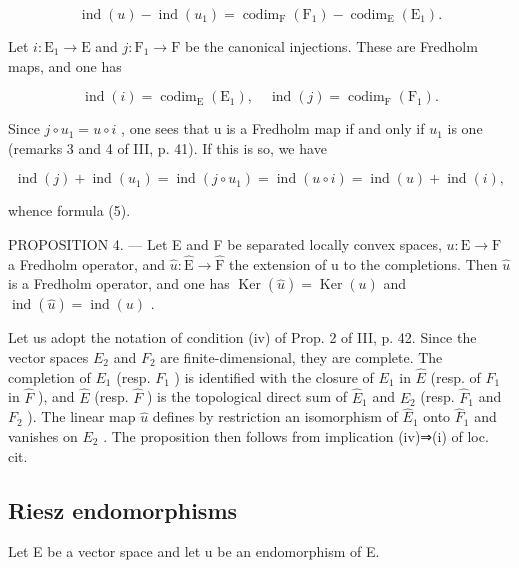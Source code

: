 \[
\operatorname{ind} (u) - \operatorname{ind} \left(u _ {1}\right) = \operatorname{codim} _ {\mathrm{F}} \left(\mathrm{F} _ {1}\right) - \operatorname{codim} _ {\mathrm{E}} \left(\mathrm{E} _ {1}\right).\tag{5}
\]

Let \(i\colon \mathrm{E}_{1}\to \mathrm{E}\) and \(j\colon \mathrm{F}_{1}\to \mathrm{F}\) be the canonical injections. These are Fredholm maps, and one has

\[
\operatorname{ind} (i) = \operatorname{codim} _ {\mathrm{E}} (\mathrm{E} _ {1}), \quad \operatorname{ind} (j) = \operatorname{codim} _ {\mathrm{F}} (\mathrm{F} _ {1}).
\]

Since \(j \circ u_{1} = u \circ i\) , one sees that u is a Fredholm map if and only if \(u_{1}\) is one (remarks 3 and 4 of III, p. 41). If this is so, we have

\[
\operatorname{ind} (j) + \operatorname{ind} (u _ {1}) = \operatorname{ind} (j \circ u _ {1}) = \operatorname{ind} (u \circ i) = \operatorname{ind} (u) + \operatorname{ind} (i),
\]

whence formula (5).

PROPOSITION 4. --- Let E and F be separated locally convex spaces, \(u: \mathrm{E} \to \mathrm{F}\) a Fredholm operator, and \(\widehat{u}: \widehat{\mathrm{E}} \to \widehat{\mathrm{F}}\) the extension of u to the completions. Then \(\widehat{u}\) is a Fredholm operator, and one has \(\operatorname{Ker}(\widehat{u}) = \operatorname{Ker}(u)\) and \(\operatorname{ind}(\widehat{u}) = \operatorname{ind}(u)\) .

Let us adopt the notation of condition (iv) of Prop. 2 of III, p. 42. Since the vector spaces \(E_{2}\) and \(F_{2}\) are finite-dimensional, they are complete. The completion of \(E_{1}\) (resp. \(F_{1}\) ) is identified with the closure of \(E_{1}\) in \(\widehat{E}\) (resp. of \(F_{1}\) in \(\widehat{F}\) ), and \(\widehat{E}\) (resp. \(\widehat{F}\) ) is the topological direct sum of \(\widehat{E}_{1}\) and \(E_{2}\) (resp. \(\widehat{F}_{1}\) and \(F_{2}\) ). The linear map \(\widehat{u}\) defines by restriction an isomorphism of \(\widehat{E}_{1}\) onto \(\widehat{F}_{1}\) and vanishes on \(E_{2}\) . The proposition then follows from implication (iv)⇒(i) of loc. cit.

\subsection{Riesz endomorphisms}

Let E be a vector space and let u be an endomorphism of E.

